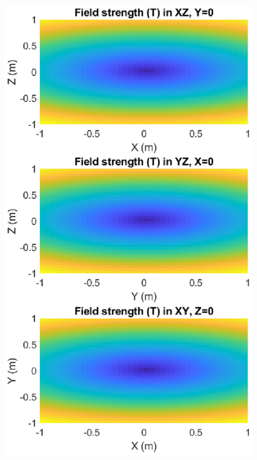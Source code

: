 \documentclass{article}
\theoremstyle{definition}
\begin{document}
\begin{figure}[!htb]
\begin{minipage}{.33\textwidth}
		\includegraphics[width=\linewidth]{sim-figs/quad-2.eps}
	\end{minipage}%
	\begin{minipage}{.33\textwidth}
		\centering

\end{minipage}
\end{figure}
\end{document}

